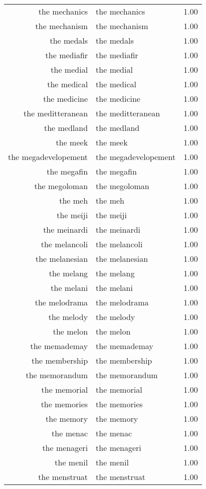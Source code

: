 \begin{table}[ht]
\begin{tabular}{rlr}
  the mechanics & the mechanics & 1.00 \\ 
  the mechanism & the mechanism & 1.00 \\ 
  the medals & the medals & 1.00 \\ 
  the mediafir & the mediafir & 1.00 \\ 
  the medial & the medial & 1.00 \\ 
  the medical & the medical & 1.00 \\ 
  the medicine & the medicine & 1.00 \\ 
  the meditteranean & the meditteranean & 1.00 \\ 
  the medland & the medland & 1.00 \\ 
  the meek & the meek & 1.00 \\ 
  the megadevelopement & the megadevelopement & 1.00 \\ 
  the megafin & the megafin & 1.00 \\ 
  the megoloman & the megoloman & 1.00 \\ 
  the meh & the meh & 1.00 \\ 
  the meiji & the meiji & 1.00 \\ 
  the meinardi & the meinardi & 1.00 \\ 
  the melancoli & the melancoli & 1.00 \\ 
  the melanesian & the melanesian & 1.00 \\ 
  the melang & the melang & 1.00 \\ 
  the melani & the melani & 1.00 \\ 
  the melodrama & the melodrama & 1.00 \\ 
  the melody & the melody & 1.00 \\ 
  the melon & the melon & 1.00 \\ 
  the memademay & the memademay & 1.00 \\ 
  the membership & the membership & 1.00 \\ 
  the memorandum & the memorandum & 1.00 \\ 
  the memorial & the memorial & 1.00 \\ 
  the memories & the memories & 1.00 \\ 
  the memory & the memory & 1.00 \\ 
  the menac & the menac & 1.00 \\ 
  the menageri & the menageri & 1.00 \\ 
  the menil & the menil & 1.00 \\ 
  the menstruat & the menstruat & 1.00 \\ 

\end{tabular}
\end{table}
